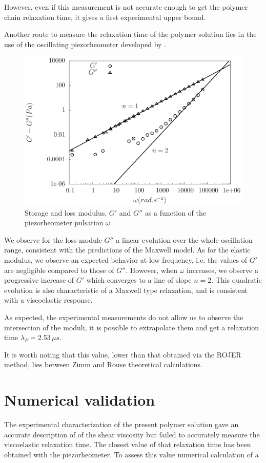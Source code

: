 \documentclass[twocolumn,10pt]{asme2ej}
\begin{document}
However, even if this measurement is not accurate enough to get the polymer chain relaxation time, it gives a first experimental upper bound.

Another route to measure the relaxation time of the polymer solution lies in the use of the oscillating piezorheometer developed by \cite{buchanan2005high}. 

\begin{figure}[H]
    \begin{center}
    \includegraphics[width=12cm]{Moduli_bilan}
    \caption{Storage and loss modulus, $G'$ and $G''$ as a function of the piezorheometer pulsation $\omega$.}
    \label{piezo}
    \end{center}
\end{figure}

We observe for the loss module $G''$ a linear evolution over the whole oscillation range, consistent with the predictions of the Maxwell model. As for the elastic modulus, we observe an expected behavior at low frequency, i.e. the values of $ G'$ are negligible compared to those of $ G''$. However, when $\omega $ increases, we observe a progressive increase of $ G'$ which converges to a line of slope $ n = 2 $. This quadratic evolution is also characteristic of a Maxwell type relaxation, and  is consistent with a viscoelastic response. 

As expected, the experimental measurements do not allow us to observe the intersection of the moduli, it is possible to extrapolate them and get a relaxation time $ \lambda_{P} = 2.53 \, \mu s $.

It is worth noting that this value, lower than that obtained via the ROJER method, lies between Zimm and Rouse theoretical calculations.

\section{Numerical validation}

The experimental characterization of the present polymer solution gave an accurate description of of the shear viscosity but failed to accurately measure the viscoelastic relaxation time. The closest value of that relaxation time has been obtained with the piezorheometer. To assess this value numerical calculation of a 



\end{document}
